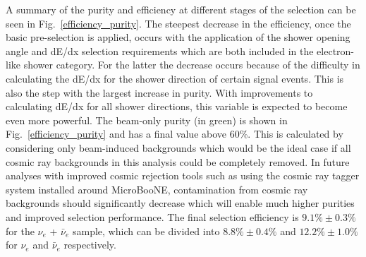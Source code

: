 A summary of the purity and efficiency at different stages of the selection can be seen in Fig.~\ref{efficiency_purity}. The steepest decrease in the efficiency, once the basic pre-selection is applied, occurs with the application of the shower opening angle and dE/dx selection requirements which are both included in the electron-like shower category. For the latter the decrease occurs because of the difficulty in calculating the dE/dx for the shower direction of certain signal events. This is also the step with the largest increase in purity. With improvements to calculating dE/dx for all shower directions, this variable is expected to become even more powerful. The beam-only purity (in green) is shown in Fig.~\ref{efficiency_purity} and has a final value above 60\%. This is calculated by considering only beam-induced backgrounds which would be the ideal case if all cosmic ray backgrounds in this analysis could be completely removed. In future analyses with improved cosmic rejection tools such as using the cosmic ray tagger system installed around MicroBooNE, contamination from cosmic ray backgrounds should significantly decrease which will enable much higher purities and improved selection performance. The final selection efficiency is $9.1\% \pm 0.3\%$ for the $\nu_e$ + $\bar{\nu}_e$ sample, which can be divided into $8.8\% \pm 0.4\%$ and  $12.2\% \pm 1.0\%$ for $\nu_{e}$ and $\bar{\nu}_e$ respectively.
